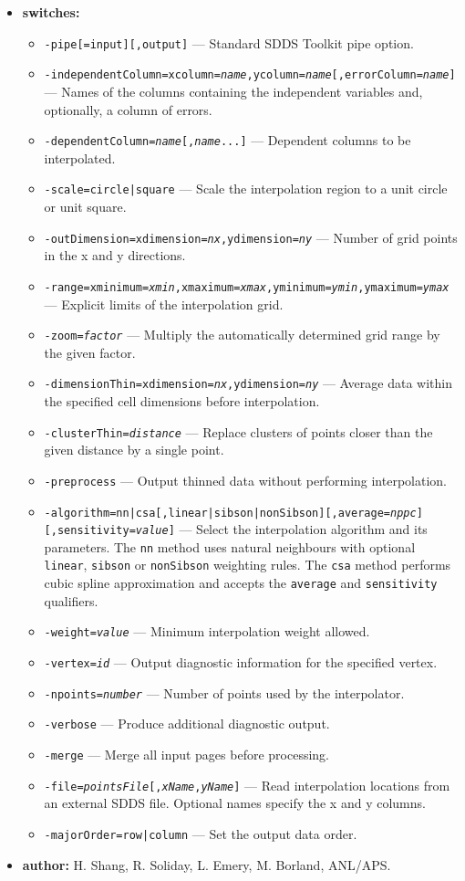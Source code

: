 \begin{itemize}
\item {\bf switches:}
  \begin{itemize}
  \item {\tt -pipe[=input][,output]} --- Standard SDDS Toolkit pipe option.
  \item {\tt -independentColumn=xcolumn={\em name},ycolumn={\em name}[,errorColumn={\em name}]} --- Names of the columns containing the independent variables and, optionally, a column of errors.
  \item {\tt -dependentColumn={\em name}[,{\em name}...]} --- Dependent columns to be interpolated.
  \item {\tt -scale=circle|square} --- Scale the interpolation region to a unit circle or unit square.
  \item {\tt -outDimension=xdimension={\em nx},ydimension={\em ny}} --- Number of grid points in the x and y directions.
  \item {\tt -range=xminimum={\em xmin},xmaximum={\em xmax},yminimum={\em ymin},ymaximum={\em ymax}} --- Explicit limits of the interpolation grid.
  \item {\tt -zoom={\em factor}} --- Multiply the automatically determined grid range by the given factor.
  \item {\tt -dimensionThin=xdimension={\em nx},ydimension={\em ny}} --- Average data within the specified cell dimensions before interpolation.
  \item {\tt -clusterThin={\em distance}} --- Replace clusters of points closer than the given distance by a single point.
  \item {\tt -preprocess} --- Output thinned data without performing interpolation.
  \item {\tt -algorithm=nn|csa[,linear|sibson|nonSibson][,average={\em nppc}][,sensitivity={\em value}]} --- Select the interpolation algorithm and its parameters.  The {\tt nn} method uses natural neighbours with optional {\tt linear}, {\tt sibson} or {\tt nonSibson} weighting rules.  The {\tt csa} method performs cubic spline approximation and accepts the {\tt average} and {\tt sensitivity} qualifiers.
  \item {\tt -weight={\em value}} --- Minimum interpolation weight allowed.
  \item {\tt -vertex={\em id}} --- Output diagnostic information for the specified vertex.
  \item {\tt -npoints={\em number}} --- Number of points used by the interpolator.
  \item {\tt -verbose} --- Produce additional diagnostic output.
  \item {\tt -merge} --- Merge all input pages before processing.
  \item {\tt -file={\em pointsFile}[,{\em xName},{\em yName}]} --- Read interpolation locations from an external SDDS file.  Optional names specify the x and y columns.
  \item {\tt -majorOrder=row|column} --- Set the output data order.
  \end{itemize}
\item {\bf author:} H. Shang, R. Soliday, L. Emery, M. Borland, ANL/APS.
\end{itemize}
